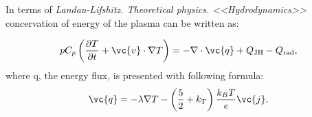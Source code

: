In terms of \textit{Landau-Lifshitz. Theoretical physics. <<Hydrodynamics>>} concervation of energy of the plasma can be written as:

\begin{equation}
	p C_p \left(\frac{\partial T}{\partial t} + \vc{v} \cdot \nabla T\right) = - \nabla \cdot \vc{q} + Q_\text{JH} - Q_\text{rad},
\end{equation}
where  q, the energy flux, is presented with following formula:
 $$\vc{q} = - \lambda \nabla T - \left(\frac{5}{2}  + k_{T}\right) \frac{k_B T}{e} \vc{j}.$$